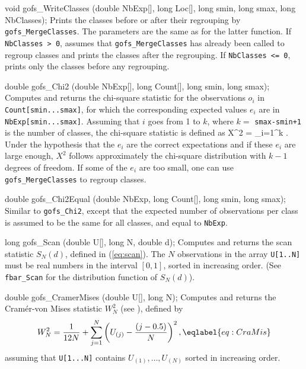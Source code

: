 void gofs_WriteClasses (double NbExp[], long Loc[], 
                        long smin, long smax, long NbClasses);
\endcode
 \tab  Prints the classes before or after their regrouping by
  {\tt gofs\_MergeClasses}.
  The parameters are the same as for the latter function.
  If {\tt NbClasses > 0}, assumes that {\tt gofs\_MergeClasses} 
  has already been called to regroup classes 
  and prints the classes after the regrouping.
  If {\tt NbClasses <= 0}, prints only the classes before any regrouping.
 \endtab


\code

double gofs_Chi2 (double NbExp[], long Count[], long smin, long smax);
\endcode
\tab  Computes and returns the chi-square statistic for the 
 observations $o_i$ in {\tt Count[smin...smax]}, for which the 
 corresponding expected values $e_i$ are in {\tt NbExp[smin...smax]}. 
 Assuming that $i$ goes from 1 to $k$, where $k =$ {\tt smax-smin+1}
 is the number of classes, the chi-square statistic is defined as
 \eq
   X^2 = \sum_{i=1}^k .  
 \endeq
 Under the hypothesis that the $e_i$ are the correct expectations and
 if these $e_i$ are large enough, $X^2$ follows approximately the
 chi-square distribution with $k-1$ degrees of freedom.
 If some of the $e_i$ are too small, one can use {\tt gofs\_MergeClasses}
 to regroup classes.
\endtab
\code


double gofs_Chi2Equal (double NbExp, long Count[], long smin, long smax);
\endcode
\tab  Similar to {\tt gofs\_Chi2}, except that the expected
  number of observations per class is assumed to be the same for 
  all classes, and equal to {\tt NbExp}.
\endtab
\code


long gofs_Scan (double U[], long N, double d);
\endcode
 \tab  Computes and returns the scan statistic $S_N(d)$,
  defined in (\ref{eq:scan}).
  The $N$ observations in the array {\tt U[1..N]} must be real numbers 
  in the interval $[0,1]$, sorted in increasing order.
  (See {\tt fbar\_Scan} for the distribution function of $S_N(d)$).
 \endtab
\code


double gofs_CramerMises (double U[], long N);
\endcode
 \tab  Computes and returns the Cram\'er-von Mises statistic $W_N^2$
   (see \cite{tDUR73a,tSTE70a,tSTE86b}), defined by
  \begin {equation}
     W_N^2 = {1\over 12N} +
            \sum_{j=1}^N \left(U_{(j)} - {(j-0.5) \over N}\right)^2,
                                                   \eqlabel {eq:CraMis}
  \end {equation}
 assuming that {\tt U[1...N]} contains $U_{(1)},\dots,U_{(N)}$ 
 sorted in increasing order. 
 \endtab
\code


